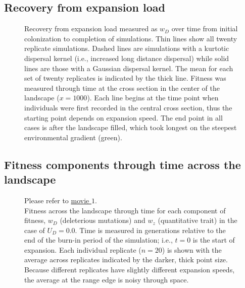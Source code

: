 \newpage{}




\subsection*{Recovery from expansion load}


\begin{figure}[h!]
\centering
{}
\caption[ ~ - Recovery from expansion load.]{Recovery from expansion load measured as $w_D$ over time from initial colonization to completion of simulations. Thin lines show all twenty replicate simulations. Dashed lines are simulations with a kurtotic dispersal kernel (i.e., increased long distance dispersal) while solid lines are those with a Gaussian dispersal kernel. The mean for each set of twenty replicates is indicated by the thick line. Fitness was measured through time at the cross section in the center of the landscape ($x = 1000$). Each line begins at the time point when individuals were first recorded in the central cross section, thus the starting point depends on expansion speed. The end point in all cases is after the landscape filled, which took longest on the steepest environmental gradient (green).}
\label{fig:recovery}
\end{figure}


\newpage{}

\subsection*{Fitness components through time across the landscape}

\begin{figure}[h!]
\caption[ ~ - Fitness across the landscape through time for each component of fitness for $U_D = 0.0$.]{Please refer to \href{http://www.zoology.ubc.ca/~kgilbert/PopFitness_U0.mp4}{movie $1$}. \\ Fitness across the landscape through time for each component of fitness, $w_D$ (deleterious mutations) and $w_z$ (quantitative trait) in the case of $U_D = 0.0$. Time is measured in generations relative to the end of the burn-in period of the simulation; i.e., $t = 0$ is the start of expansion. Each individual replicate ($n = 20$) is shown with the average across replicates indicated by the darker, thick point size. Because different replicates have slightly different expansion speeds, the average at the range edge is noisy through space.}
\label{fig:fitmov1}
\end{figure}

